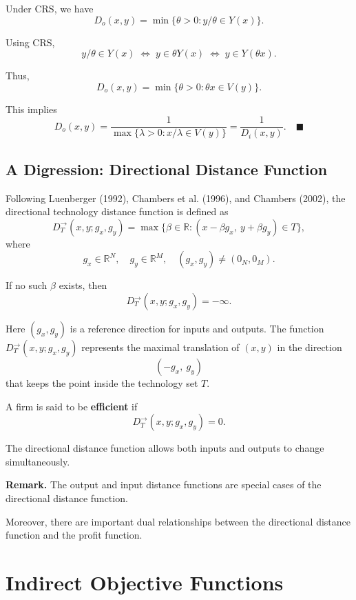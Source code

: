 Under CRS, we have
\[
D_o(x,y)
=
\min \{\theta > 0 : y/\theta \in Y(x)\}.
\]

Using CRS,
\[
y/\theta \in Y(x)
\;\Longleftrightarrow\;
y \in \theta Y(x)
\;\Longleftrightarrow\;
y \in Y(\theta x).
\]

Thus,
\[
D_o(x,y)
=
\min \{\theta > 0 : \theta x \in V(y)\}.
\]

This implies
\[
D_o(x,y)
=
\frac{1}{\max \{ \lambda > 0 : x/\lambda \in V(y)\}}
=
\frac{1}{D_i(x,y)}.
\quad \blacksquare
\]

\subsection*{A Digression: Directional Distance Function}

Following Luenberger (1992), Chambers et al. (1996), and Chambers (2002),
the directional technology distance function is defined as
\[
D^{\rightarrow}_T(x,y;g_x,g_y)
=
\max \{\beta \in \mathbb{R} : (x - \beta g_x,\ y + \beta g_y) \in T\},
\]
where
\[
g_x \in \mathbb{R}^N,\quad g_y \in \mathbb{R}^M,\quad (g_x,g_y) \ne (0_N,0_M).
\]

If no such $\beta$ exists, then
\[
D^{\rightarrow}_T(x,y;g_x,g_y) = -\infty.
\]

\medskip

Here $(g_x,g_y)$ is a reference direction for inputs and outputs.
The function $D^{\rightarrow}_T(x,y;g_x,g_y)$ represents the maximal translation
of $(x,y)$ in the direction
\[
(-g_x,\ g_y)
\]
that keeps the point inside the technology set $T$.

\medskip

A firm is said to be \textbf{efficient} if
\[
D^{\rightarrow}_T(x,y;g_x,g_y) = 0.
\]

\medskip

The directional distance function allows both inputs and outputs to change
simultaneously.

\medskip

\textbf{Remark.}  
The output and input distance functions are special cases of the directional
distance function.

Moreover, there are important dual relationships between the directional
distance function and the profit function.




\section{Indirect Objective Functions}

